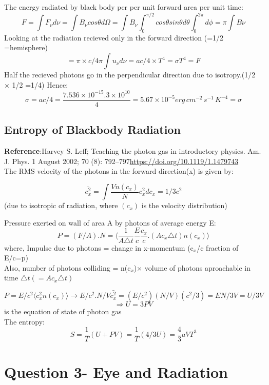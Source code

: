 \documentclass[11pt]{article}
\begin{document}
		The energy radiated by black body per per unit forward area per unit time:
		\[
			F = \int F_\nu d\nu =\int B_\nu cos\theta d\Omega  = \int B_\nu \int_{0}^{\pi/2} cos\theta sin\theta d\theta \int_{0}^{2\pi} d\phi = \pi\int B\nu 
		\]
		Looking at the radiation recieved only in the forward direction (=1/2 =hemisphere)
		\[
			= \pi \times c/4\pi \int u_\nu d\nu = \boxed{ac/4 \times T^4 = \sigma T^4 =F}
		\]
		Half the recieved photons go in the perpendicular direction due to isotropy.(1/2 $\times$ 1/2 =1/4)
		Hence:
		\[
			\boxed{\sigma = ac/4} = \frac{7.536 \times 10^{-15} . 3 \times 10^{10}}{4} =\boxed{ 5.67 \times 10^{-5} erg \, cm^{-2} \, s^{-1} \, K^{-4}=\sigma}
		\]
		
		\subsection{Entropy of Blackbody Radiation}
		
		\textbf{Reference}:Harvey S. Leff; Teaching the photon gas in introductory physics. Am. J. Phys. 1 August 2002; 70 (8): 792–797\url{https://doi.org/10.1119/1.1479743}\\
			
		The RMS velocity of the photons in the forward direction(x) is given by:
	
		\[
			\bar{c_x^2} = \int \frac{Vn(c_x)}{N} c_x^2 dc_x =1/3 c^2
		\]
		(due to isotropic of radiation, where $(c_x)$ is the velocity distribution)
		
		Pressure exerted on wall of area A by photons of average energy E:
		\[
			P = (F/A) . N = \langle \frac{1}{A\triangle t}\frac{E}{c}\frac{c_x}{c} . (Ac_x\triangle t)n(c_x)\rangle
		\] 
		where, Impulse due to photons = change in x-momentum (c$_x$/c fraction of E/c=p)\\
		Also, number of photons colliding = n(c$_x$)$\times$ volume of photons aproachable in time $\triangle t(=A c_x\triangle t)$ 
		
		\[
			P = E/c^2 \langle c_x^2 n(c_x)\rangle \rightarrow E/c^2 . N/V \bar{c_x^2} = (E/c^2) (N/V) (c^2/3) =EN/3V = U/3V
		\] 
		\[
			\Rightarrow U=3PV
		\]
		is the equation of state of photon gas\\
		The entropy:
		\[
			\boxed{S = \frac{1}{T}(U+PV) = \frac{1}{T}(4/3 U) = \frac{4}{3} aVT^3}
		\]
		
		\section{\color{teal}Question 3- Eye and Radiation}
		
\end{document}
